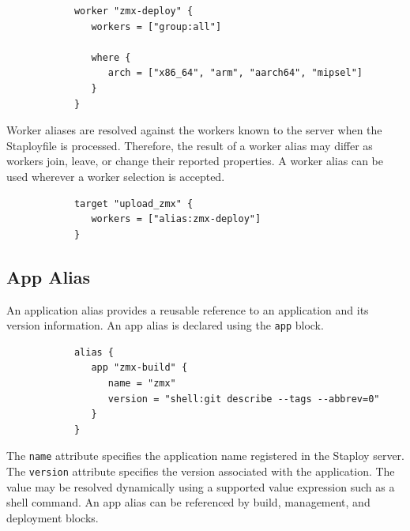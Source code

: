 \documentclass[11pt,a4paper]{article}
\begin{document}
    \begin{center}
        \begin{verbatim}
            worker "zmx-deploy" {
               workers = ["group:all"]

               where {
                  arch = ["x86_64", "arm", "aarch64", "mipsel"]
               }
            }
        \end{verbatim}
    \end{center}

    Worker aliases are resolved against the workers known to the server when the Staployfile is processed.
    Therefore, the result of a worker alias may differ as workers join, leave, or change their reported properties.
    A worker alias can be used wherever a worker selection is accepted.

    \begin{center}
        \begin{verbatim}
            target "upload_zmx" {
               workers = ["alias:zmx-deploy"]
            }
        \end{verbatim}
    \end{center}

    \subsection{App Alias}\label{subsec:app-alias}

    An application alias provides a reusable reference to an application and its version information.
    An app alias is declared using the \texttt{app} block.

    \begin{center}
        \begin{verbatim}
            alias {
               app "zmx-build" {
                  name = "zmx"
                  version = "shell:git describe --tags --abbrev=0"
               }
            }
        \end{verbatim}
    \end{center}

    The \texttt{name} attribute specifies the application name registered in the Staploy server.
    The \texttt{version} attribute specifies the version associated with the application.
    The value may be resolved dynamically using a supported value expression such as a shell command.
    An app alias can be referenced by build, management, and deployment blocks.
\end{document}
